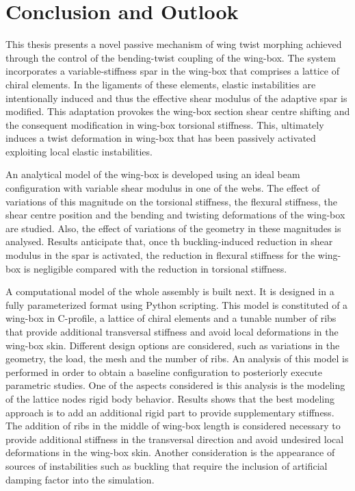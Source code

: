 \chapter{Conclusion and Outlook} \label{chap:summary}
%
%

This thesis presents a novel passive mechanism of wing twist morphing achieved through the control of the bending-twist coupling of the wing-box. The system incorporates a variable-stiffness spar in the wing-box that comprises a lattice of chiral elements. In the ligaments of these elements, elastic instabilities are intentionally induced and thus the effective shear modulus of the adaptive spar is modified. This adaptation provokes the wing-box section shear centre shifting and the consequent modification in wing-box torsional stiffness. This, ultimately induces a twist deformation in wing-box that has been passively activated exploiting local elastic instabilities.

An analytical model of the wing-box is developed using an ideal beam configuration with variable shear modulus in one of the webs. The effect of variations of this magnitude on the torsional stiffness, the flexural stiffness, the shear centre position and the bending and twisting deformations of the wing-box are studied. Also, the effect of variations of the geometry in these magnitudes is analysed. Results anticipate that, once th buckling-induced reduction in shear modulus in the spar is activated, the reduction in flexural stiffness for the wing-box is negligible compared with the reduction in torsional stiffness. 

A computational model of the whole assembly is built next. It is designed in a fully parameterized format using Python scripting. This model is constituted of a wing-box in C-profile, a lattice of chiral elements and a tunable number of ribs that provide additional transversal stiffness and avoid local deformations in the wing-box skin. Different design options are considered, such as variations in the geometry, the load, the mesh and the number of ribs. An analysis of this model is performed in order to obtain a baseline configuration to posteriorly execute parametric studies. One of the aspects considered is this analysis is the modeling of the lattice nodes rigid body behavior. Results shows that the best modeling approach is to add an additional rigid part to provide supplementary stiffness. The addition of ribs in the middle of wing-box length is considered necessary to provide additional stiffness in the transversal direction and avoid undesired local deformations in the wing-box skin. Another consideration is the appearance of sources of instabilities such as buckling that require the inclusion of artificial damping factor into the simulation. 

